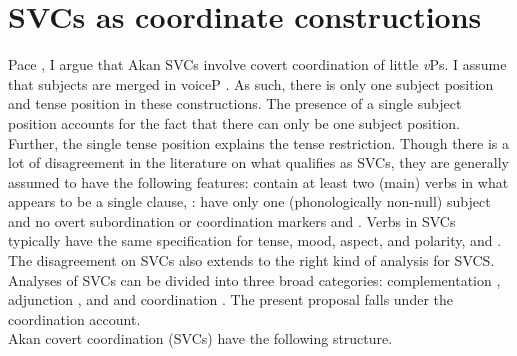 \documentclass[output=paper,
modfonts
]{langscibook}
\begin{document}
\section{SVCs as coordinate constructions}
Pace \citet{Martin2011}, I argue that Akan SVCs involve covert coordination of little \emph{v}Ps. I assume that subjects are merged in voiceP \citep{Kratzer1996}. As such, there is only one subject position and tense position in these constructions. The presence of a single subject position accounts for the fact that there can only be one subject position.  Further, the single tense position explains the tense restriction. Though there is a lot of disagreement in the literature on what qualifies as SVCs, they are generally assumed to have the following features: contain at least two (main) verbs in what appears to be a single clause, \citep{Veenstra1993}: have only one (phonologically non-null) subject and no overt subordination or coordination markers \citep{JansenEtAl1978} and \citep{Sebba1987}. Verbs in SVCs typically have the same specification for tense, mood, aspect, and polarity, \citep{Baker1989} and \citep{Collins1997}. The disagreement on SVCs also extends to the right kind of analysis for SVCS. Analyses of SVCs can be divided into three broad categories: complementation \citep{Baker1989, BakerStewart2002, Collins1997, Aboh2009}, adjunction \citep{BakerStewart2002}, and and coordination \citep{Agbedor1994}. The present proposal falls under the coordination account.\\
Akan covert coordination (SVCs) have the following structure.
\end{document}
